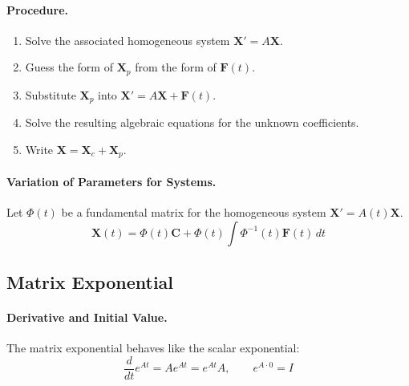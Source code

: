 \documentclass[oneside]{book}
\begin{document}
\paragraph{Procedure.}
\begin{enumerate}
    \item Solve the associated homogeneous system $\mathbf{X}'=A\mathbf{X}$.
    \item Guess the form of $\mathbf{X}_p$ from the form of $\mathbf{F}(t)$.
    \item Substitute $\mathbf{X}_p$ into $\mathbf{X}'=A\mathbf{X}+\mathbf{F}(t)$.
    \item Solve the resulting algebraic equations for the unknown coefficients.
    \item Write $\mathbf{X}=\mathbf{X}_c+\mathbf{X}_p$.
\end{enumerate}

\paragraph{Variation of Parameters for Systems.}
Let $\Phi(t)$ be a fundamental matrix for the homogeneous system
$\mathbf{X}'=A(t)\mathbf{X}$.
\[
    \mathbf{X}(t)=\Phi(t)\mathbf{C}
    +
    \Phi(t)\int \Phi^{-1}(t)\mathbf{F}(t)\,dt
\]

\subsection{Matrix Exponential}


\paragraph{Derivative and Initial Value.}
The matrix exponential behaves like the scalar exponential:
\[
    \frac{d}{dt}e^{At}=Ae^{At}=e^{At}A,
    \qquad
    e^{A\cdot 0}=I
\]

\end{document}

